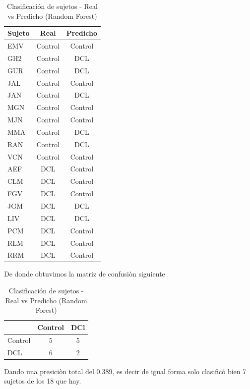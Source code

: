 \begin{table}[H]
\centering
\caption{Clasificación de sujetos - Real vs Predicho (Random Forest)}
\label{tab:clasificacion_rf2}
\begin{tabular}{lcc}
\toprule
\textbf{Sujeto} & \textbf{Real} & \textbf{Predicho} \\
\midrule
EMV  & Control & Control \\
GH2  & Control & DCL \\
GUR  & Control & DCL \\
JAL  & Control & Control \\
JAN  & Control & DCL \\
MGN  & Control & Control \\
MJN  & Control & Control \\
MMA  & Control & DCL \\
RAN  & Control & DCL \\
VCN  & Control & Control \\
AEF  & DCL     & Control \\
CLM  & DCL     & Control \\
FGV  & DCL     & Control \\
JGM  & DCL     & DCL \\
LIV  & DCL     & DCL \\
PCM  & DCL     & Control \\
RLM  & DCL     & Control \\
RRM  & DCL     & Control \\
\bottomrule
\end{tabular}
\end{table}

De donde obtuvimos la matriz de confusiòn siguiente

\begin{table}[H]
\centering
\caption{Clasificación de sujetos - Real vs Predicho (Random Forest)}
\label{tab:clasificacion4_rf}
\begin{tabular}{lcc}
\toprule
\textbf{} & \textbf{Control} & \textbf{DCl} \\
\midrule
Control & 5 & 5 \\
DCL  & 6 & 2 \\
\bottomrule
\end{tabular}
\end{table}

Dando una presiciòn total del 0.389, es decir de igual forma solo clasificò bien 7 sujetos de los
18 que hay.




